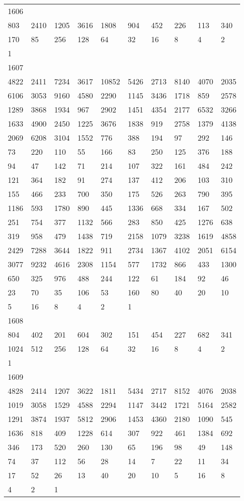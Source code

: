\begin{longtable}{*{10}{l}}
1606&&&&&&&&&\\
803& 2410& 1205& 3616& 1808& 904& 452& 226& 113& 340\\
170& 85& 256& 128& 64& 32& 16& 8& 4& 2\\
1& \\

1607&&&&&&&&&\\
4822& 2411& 7234& 3617& 10852& 5426& 2713& 8140& 4070& 2035\\
6106& 3053& 9160& 4580& 2290& 1145& 3436& 1718& 859& 2578\\
1289& 3868& 1934& 967& 2902& 1451& 4354& 2177& 6532& 3266\\
1633& 4900& 2450& 1225& 3676& 1838& 919& 2758& 1379& 4138\\
2069& 6208& 3104& 1552& 776& 388& 194& 97& 292& 146\\
73& 220& 110& 55& 166& 83& 250& 125& 376& 188\\
94& 47& 142& 71& 214& 107& 322& 161& 484& 242\\
121& 364& 182& 91& 274& 137& 412& 206& 103& 310\\
155& 466& 233& 700& 350& 175& 526& 263& 790& 395\\
1186& 593& 1780& 890& 445& 1336& 668& 334& 167& 502\\
251& 754& 377& 1132& 566& 283& 850& 425& 1276& 638\\
319& 958& 479& 1438& 719& 2158& 1079& 3238& 1619& 4858\\
2429& 7288& 3644& 1822& 911& 2734& 1367& 4102& 2051& 6154\\
3077& 9232& 4616& 2308& 1154& 577& 1732& 866& 433& 1300\\
650& 325& 976& 488& 244& 122& 61& 184& 92& 46\\
23& 70& 35& 106& 53& 160& 80& 40& 20& 10\\
5& 16& 8& 4& 2& 1& \\

1608&&&&&&&&&\\
804& 402& 201& 604& 302& 151& 454& 227& 682& 341\\
1024& 512& 256& 128& 64& 32& 16& 8& 4& 2\\
1& \\

1609&&&&&&&&&\\
4828& 2414& 1207& 3622& 1811& 5434& 2717& 8152& 4076& 2038\\
1019& 3058& 1529& 4588& 2294& 1147& 3442& 1721& 5164& 2582\\
1291& 3874& 1937& 5812& 2906& 1453& 4360& 2180& 1090& 545\\
1636& 818& 409& 1228& 614& 307& 922& 461& 1384& 692\\
346& 173& 520& 260& 130& 65& 196& 98& 49& 148\\
74& 37& 112& 56& 28& 14& 7& 22& 11& 34\\
17& 52& 26& 13& 40& 20& 10& 5& 16& 8\\
4& 2& 1& \\


\end{longtable}
